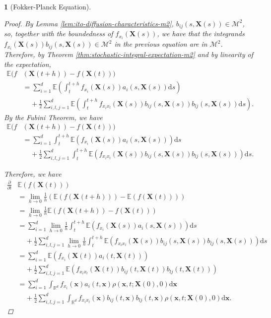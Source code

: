 \documentclass[english]{article}
\numberwithin{equation}{section}
\numberwithin{figure}{section}
\theoremstyle{bolddescit}
\newtheorem{theorem}{\protect\theoremname}[section]
\theoremstyle{definition}
\theoremstyle{definition}
\theoremstyle{plain}
\theoremstyle{plain}
\theoremstyle{bolddesc}
\theoremstyle{plain}
\theoremstyle{remark}
\providecommand{\theoremname}{Theorem}
\begin{document}
\begin{theorem}[Fokker-Planck Equation]
\begin{proof}
    By Lemma \ref{lem:ito-diffusion-characteristics-m2}, $b_{ij}(s,\mathbf{X}(s)) \in \mathcal{M}^2$, so, together with the boundedness of $f_{x_i}(\mathbf{X}(s))$, we have that the integrands $f_{x_i}(\mathbf{X}(s))b_{ij}(s,\mathbf{X}(s)) \in \mathcal{M}^2$ in the previous equation are in $\mathcal{M}^2$. Therefore, by Theorem \ref{thm:stochastic-integral-expectation-m2} and by linearity of the expectation,
    \begin{align*}
      \mathbb{E}(f&(\mathbf{X}(t+h)) - f(\mathbf{X}(t)))\\
      &= \sum_{i=1}^{d} \mathbb{E}\left(\int_t^{t+h} f_{x_i}(\mathbf{X}(s)) a_i(s,\mathbf{X}(s)) \mathrm{d}s\right)\\
        &\ \ \ \ \ + \frac{1}{2} \sum_{i,l,j=1}^{d} \mathbb{E}\left(\int_t^{t+h} f_{x_i x_l}(\mathbf{X}(s)) b_{ij}(s,\mathbf{X}(s)) b_{lj}(s,\mathbf{X}(s)) \mathrm{d}s\right).
    \end{align*}
    By the Fubini Theorem, we have
    \begin{align*}
      \mathbb{E}(f&(\mathbf{X}(t+h)) - f(\mathbf{X}(t)))\\
      &= \sum_{i=1}^{d} \int_t^{t+h} \mathbb{E}(f_{x_i}(\mathbf{X}(s)) a_i(s,\mathbf{X}(s))) \mathrm{d}s\\
        &\ \ \ \ \ + \frac{1}{2} \sum_{i,l,j=1}^{d} \int_t^{t+h} \mathbb{E}\left(f_{x_i x_l}(\mathbf{X}(s)) b_{ij}(s,\mathbf{X}(s)) b_{lj}(s,\mathbf{X}(s))\right) \mathrm{d}s.
    \end{align*}

    Therefore, we have
    \begin{align*}
      \frac{\partial}{\partial t}&\mathbb{E}(f(\mathbf{X}(t)))\\
      &= \lim_{h \to 0} \frac{1}{h} (\mathbb{E}(f(\mathbf{X}(t+h))) - \mathbb{E}(f(\mathbf{X}(t))))\\
      &= \lim_{h \to 0} \frac{1}{h} \mathbb{E}(f(\mathbf{X}(t+h)) - f(\mathbf{X}(t))) \tag{linearity}\\
      &= \sum_{i=1}^{d} \lim_{h \to 0} \frac{1}{h} \int_t^{t+h} \mathbb{E}(f_{x_i}(\mathbf{X}(s)) a_i(s,\mathbf{X}(s))) \mathrm{d}s\\
        &\ \ \ \ \ + \frac{1}{2} \sum_{i,l,j=1}^{d} \lim_{h \to 0} \frac{1}{h} \int_t^{t+h} \mathbb{E}\left(f_{x_i x_l}(\mathbf{X}(s)) b_{ij}(s,\mathbf{X}(s)) b_{lj}(s,\mathbf{X}(s))\right) \mathrm{d}s\\
      &= \sum_{i=1}^{d} \mathbb{E}(f_{x_i}(\mathbf{X}(t)) a_i(t,\mathbf{X}(t)))\\
        &\ \ \ \ \ + \frac{1}{2} \sum_{i,l,j=1}^{d} \mathbb{E}\left(f_{x_i x_l}(\mathbf{X}(t)) b_{ij}(t,\mathbf{X}(t)) b_{lj}(t,\mathbf{X}(t))\right)\\
      &= \sum_{i=1}^{d} \int_{\mathbb{R}^d} f_{x_i}(\mathbf{x}) a_i(t,\mathbf{x})\rho(\mathbf{x},t;\mathbf{X}(0),0) \mathrm{d}\mathbf{x}\\
        &\ \ \ \ \ + \frac{1}{2} \sum_{i,l,j=1}^{d} \int_{\mathbb{R}^d} f_{x_i x_l}(\mathbf{x}) b_{ij}(t,\mathbf{x}) b_{lj}(t,\mathbf{x}) \rho(\mathbf{x},t;\mathbf{X}(0),0) \mathrm{d}\mathbf{x}.
    \end{align*}


\end{proof}
\end{theorem}
\end{document}
